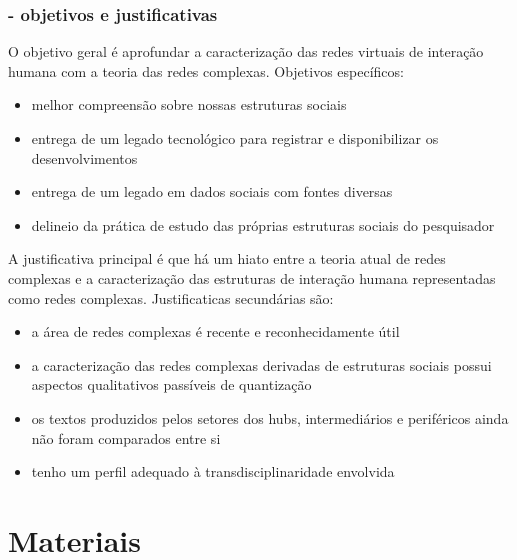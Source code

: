 \documentclass[10pt]{beamer}
\begin{document}
\begin{frame}
\frametitle{- objetivos e justificativas}
O objetivo geral é aprofundar a caracterização das redes virtuais de interação humana
com a teoria das redes complexas.
Objetivos específicos:
\begin{itemize}
	\item melhor compreensão sobre nossas estruturas sociais
	\item entrega de um legado tecnológico para registrar e disponibilizar os desenvolvimentos
	\item entrega de um legado em dados sociais com fontes diversas
	\item delineio da prática de estudo das próprias estruturas sociais do pesquisador
\end{itemize}

\vspace{.5cm}

A justificativa principal é que há um hiato entre a teoria atual de redes complexas
e a caracterização das estruturas de interação humana representadas como redes complexas.
Justificaticas secundárias são:
\begin{itemize}
	\item a área de redes complexas é recente e reconhecidamente útil
	\item a caracterização das redes complexas derivadas de estruturas sociais possui aspectos qualitativos passíveis de quantização
	\item os textos produzidos pelos setores dos hubs, intermediários e periféricos ainda não foram comparados entre si
	\item tenho um perfil adequado à transdisciplinaridade envolvida
\end{itemize}

\end{frame}



\section{Materiais}
\end{document}
